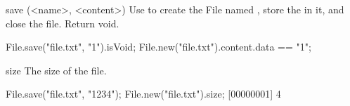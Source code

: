 \begin{urbiscriptapi}
\item[save](<name>, <content>)
  Use  to create the File named , store the
   in it, and close the file.  Return void.
\begin{urbiassert}
File.save("file.txt", "1\n").isVoid;
File.new("file.txt").content.data == "1\n";
\end{urbiassert}


\item[size]
  The size of the file.
\begin{urbiscript}
File.save("file.txt", "1234");
File.new("file.txt").size;
[00000001] 4
\end{urbiscript}
\end{urbiscriptapi}


